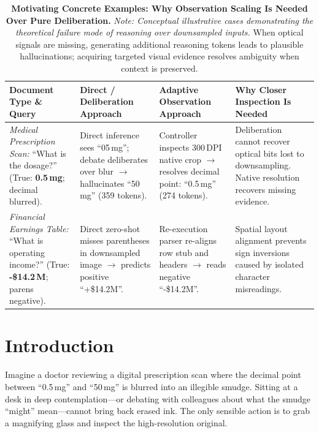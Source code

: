 \documentclass[11pt]{article}
\begin{document}
\begin{table}[t]
\centering
\small
\renewcommand{\arraystretch}{0.88}
\begin{tabularx}{\textwidth}{@{} p{3.2cm} p{3.6cm} p{3.6cm} X @{}}
\toprule
\textbf{Document Type \& Query} & \textbf{Direct / Deliberation Approach} & \textbf{Adaptive Observation Approach} & \textbf{Why Closer Inspection Is Needed} \\
\midrule
\textit{Medical Prescription Scan:} \newline ``What is the dosage?'' \newline (True: \textbf{0.5\,mg}; decimal blurred). & Direct inference sees ``05\,mg''; debate deliberates over blur $\to$ hallucinates ``50\,mg'' (359 tokens). & Controller inspects 300\,DPI native crop $\to$ resolves decimal point: ``0.5\,mg'' (274 tokens). & Deliberation cannot recover optical bits lost to downsampling. Native resolution recovers missing evidence. \\
\midrule
\textit{Financial Earnings Table:} \newline ``What is operating income?'' \newline (True: \textbf{-\$14.2\,M}; parens negative). & Direct zero-shot misses parentheses in downsampled image $\to$ predicts positive ``+\$14.2M''. & Re-execution parser re-aligns row stub and headers $\to$ reads negative ``-\$14.2M''. & Spatial layout alignment prevents sign inversions caused by isolated character misreadings. \\
\bottomrule
\end{tabularx}
\vspace{-2mm}
\caption{\textbf{Motivating Concrete Examples: Why Observation Scaling Is Needed Over Pure Deliberation.} \textit{Note: Conceptual illustrative cases demonstrating the theoretical failure mode of reasoning over downsampled inputs.} When optical signals are missing, generating additional reasoning tokens leads to plausible hallucinations; acquiring targeted visual evidence resolves ambiguity when context is preserved.}
\label{tab:example_cases}
\vspace{-3mm}
\end{table}

\section{Introduction}
\label{sec:intro}

Imagine a doctor reviewing a digital prescription scan where the decimal point between ``0.5\,mg'' and ``50\,mg'' is blurred into an illegible smudge. Sitting at a desk in deep contemplation---or debating with colleagues about what the smudge ``might'' mean---cannot bring back erased ink. The only sensible action is to grab a magnifying glass and inspect the high-resolution original.
\end{document}
